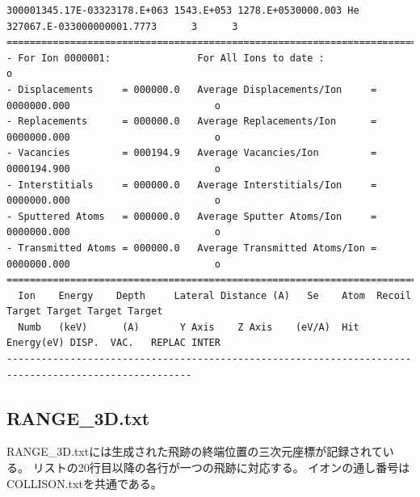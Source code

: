 \documentclass [11pt,a4paper,dvipdfmx] {jarticle}
\begin{document}
\begin{lstlisting}[caption={COLLISION.txtの例。1イベントのみ抽出。},basicstyle=\fontsize{6}{6}\ttfamily,identifierstyle=\fontsize{6}{6},numberstyle={\tiny},columns=fixed]
300001345.17E-03323178.E+063 1543.E+053 1278.E+0530000.003 He 327067.E-033000000001.7773      3      3
======================================================================================================
- For Ion 0000001:               For All Ions to date :                                              o
- Displacements     = 000000.0   Average Displacements/Ion     = 0000000.000                         o
- Replacements      = 000000.0   Average Replacements/Ion      = 0000000.000                         o
- Vacancies         = 000194.9   Average Vacancies/Ion         = 0000194.900                         o
- Interstitials     = 000000.0   Average Interstitials/Ion     = 0000000.000                         o
- Sputtered Atoms   = 000000.0   Average Sputter Atoms/Ion     = 0000000.000                         o
- Transmitted Atoms = 000000.0   Average Transmitted Atoms/Ion = 0000000.000                         o
======================================================================================================
  Ion    Energy    Depth     Lateral Distance (A)   Se    Atom  Recoil    Target Target Target Target 
  Numb   (keV)      (A)       Y Axis    Z Axis    (eV/A)  Hit  Energy(eV) DISP.  VAC.   REPLAC INTER  
------------------------------------------------------------------------------------------------------
\end{lstlisting}

\subsection{RANGE\_3D.txt}
RANGE\_3D.txtには生成された飛跡の終端位置の三次元座標が記録されている。
リストの20行目以降の各行が一つの飛跡に対応する。
イオンの通し番号はCOLLISON.txtを共通である。
\end{document}
